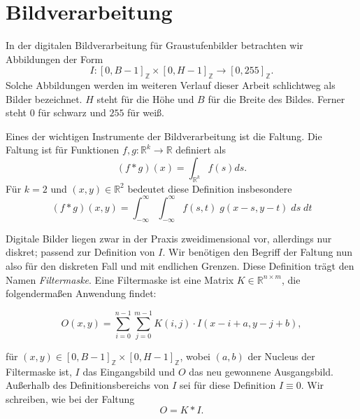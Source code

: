 \documentclass[a4paper, 11pt]{report}
\renewcommand{\emph}[1]{\textit{#1}}
\theoremstyle{definition}
\begin{document}
	\section{Bildverarbeitung}\label{sec:imageproc}
		In der digitalen Bildverarbeitung für Graustufenbilder betrachten wir Abbildungen der Form
		$$ I: [0, B-1]_\mathbb{Z} \times [0, H-1]_\mathbb{Z} \to [0,255]_\mathbb{Z}. $$
		Solche Abbildungen werden im weiteren Verlauf dieser Arbeit schlichtweg als Bilder bezeichnet. $H$ steht für die Höhe und $B$ für die Breite des Bildes. Ferner steht $0$ für schwarz und $255$ für weiß.
		
		Eines der wichtigen Instrumente der Bildverarbeitung ist die Faltung. Die Faltung ist für Funktionen $f,g : \mathbb{R}^k \to \mathbb{R}$ definiert als
		$$ (f * g)(x) = \int_{\mathbb{R}^k} f(s) ds.$$
		Für $k = 2$ und $(x,y) \in \mathbb{R}^2$ bedeutet diese Definition insbesondere
		$$ (f*g)(x, y) = \int_{-\infty}^{\infty} \int_{-\infty}^{\infty} f(s, t) \; g(x - s, y - t) \; ds \; dt$$

		Digitale Bilder liegen zwar in der Praxis zweidimensional vor, allerdings nur diskret; passend zur Definition von $I$. Wir benötigen den Begriff der Faltung nun also für den diskreten Fall und mit endlichen Grenzen. Diese Definition trägt den Namen \emph{Filtermaske}.
		Eine Filtermaske ist eine Matrix $K \in \mathbb{R}^{n \times m}$, die folgendermaßen Anwendung findet:
		
		$$ O(x,y) = \sum_{i=0}^{n-1} \sum_{j=0}^{m-1} K(i,j) \cdot I(x-i+a, y-j+b),$$
		
		für $(x,y) \in [0, B-1]_\mathbb{Z} \times [0, H-1]_\mathbb{Z}$, wobei $(a,b)$ der Nucleus der Filtermaske ist, $I$ das Eingangsbild und $O$ das neu gewonnene Ausgangsbild. Außerhalb des Definitionsbereichs von $I$ sei für diese Definition $I \equiv 0$.
		Wir schreiben, wie bei der Faltung
		$$ O = K * I.$$
\end{document}
